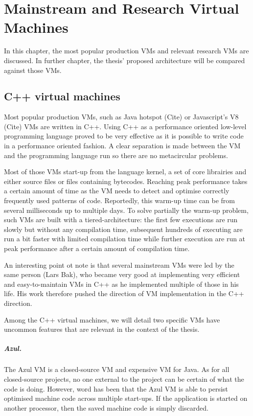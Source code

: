 \documentclass[a4paper,12pt,twoside]{../includes/ThesisStyle}
\begin{document}
\fi

\chapter{Mainstream and Research Virtual Machines}
\label{chap:stateOfTheArt}
\minitoc

In this chapter, the most popular production VMs and relevant research VMs are discussed. In further chapter, the thesis' proposed architecture will be compared against those VMs. 

\section{C++ virtual machines}

Most popular production VMs, such as Java hotspot (Cite) or Javascript's V8 (Cite) VMs are written in C++. Using C++ as a performance oriented low-level programming language proved to be very effective as it is possible to write code in a performance oriented fashion. A clear separation is made between the VM and the programming language run so there are no metacircular problems.

Most of those VMs start-up from the language kernel, a set of core librairies and either source files or files containing bytecodes. Reaching peak performance takes a certain amount of time as the VM needs to detect and optimise correctly frequently used patterns of code. Reportedly, this warm-up time can be from several milliseconds up to multiple days. To solve partially the warm-up problem, such VMs are built with a tiered-architecture: the first few executions are run slowly but without any compilation time, subsequent hundreds of executing are run a bit faster with limited compilation time while further execution are run at peak performance after a certain amount of compilation time.

An interesting point ot note is that several mainstream VMs were led by the same person (Lars Bak), who became very good at implementing very efficient and easy-to-maintain VMs in C++ as he implemented multiple of those in his life. His work therefore pushed the direction of VM implementation in the C++ direction.

Among the C++ virtual machines, we will detail two specific VMs have uncommon features that are relevant in the context of the thesis. 

\paragraph{Azul.}
The Azul VM \cite{Azul} is a closed-source VM and expensive VM for Java. As for all closed-source projects, no one external to the project can be certain of what the code is doing. However, word has been that the Azul VM is able to persist optimised machine code across multiple start-ups. If the application is started on another processor, then the saved machine code is simply discarded. 
\end{document}
